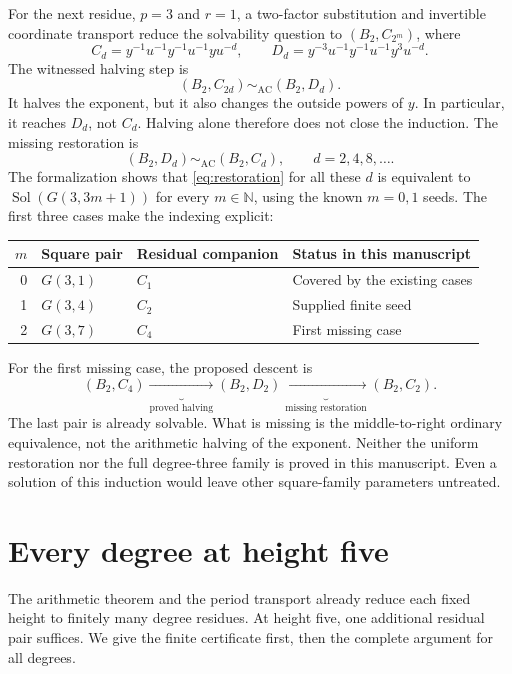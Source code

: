 \documentclass[11pt]{article}
\theoremstyle{definition}\newtheorem{definition}[theorem]{Definition}
\theoremstyle{remark}\newtheorem{remark}[theorem]{Remark}
\newcommand{\Sol}{\operatorname{Sol}}
\newcommand{\AC}{\mathrel{\sim_{\mathrm{AC}}}}
\begin{document}
For the next residue, $p=3$ and $r=1$, a two-factor substitution and invertible coordinate transport reduce the solvability question to $(B_2,C_{2^m})$, where
\[
C_d=y^{-1}u^{-1}y^{-1}u^{-1}yu^{-d},\qquad
D_d=y^{-3}u^{-1}y^{-1}u^{-1}y^3u^{-d}.
\]
The witnessed halving step is
\[
(B_2,C_{2d})\AC(B_2,D_d).
\]
It halves the exponent, but it also changes the outside powers of $y$. In particular, it reaches $D_d$, not $C_d$. Halving alone therefore does not close the induction. The missing restoration is
\begin{equation}\label{eq:restoration}
(B_2,D_d)\AC(B_2,C_d),\qquad d=2,4,8,\ldots.
\end{equation}
The formalization shows that \eqref{eq:restoration} for all these $d$ is equivalent to $\Sol(G(3,3m+1))$ for every $m\in\mathbb N$, using the known $m=0,1$ seeds. The first three cases make the indexing explicit:
\begin{center}
\begin{tabular}{@{}rlll@{}}
\toprule
$m$ & Square pair & Residual companion & Status in this manuscript\\
\midrule
0 & $G(3,1)$ & $C_1$ & Covered by the existing cases\\
1 & $G(3,4)$ & $C_2$ & Supplied finite seed\\
2 & $G(3,7)$ & $C_4$ & First missing case\\
\bottomrule
\end{tabular}
\end{center}
For the first missing case, the proposed descent is
\[
(B_2,C_4)\underbrace{\longrightarrow}_{\text{proved halving}}
(B_2,D_2)\underbrace{\longrightarrow}_{\text{missing restoration}}
(B_2,C_2).
\]
The last pair is already solvable. What is missing is the middle-to-right ordinary equivalence, not the arithmetic halving of the exponent. Neither the uniform restoration nor the full degree-three family is proved in this manuscript. Even a solution of this induction would leave other square-family parameters untreated.

\section{Every degree at height five}\label{sec:h5}
The arithmetic theorem and the period transport already reduce each fixed height to finitely many degree residues. At height five, one additional residual pair suffices. We give the finite certificate first, then the complete argument for all degrees.
\end{document}
